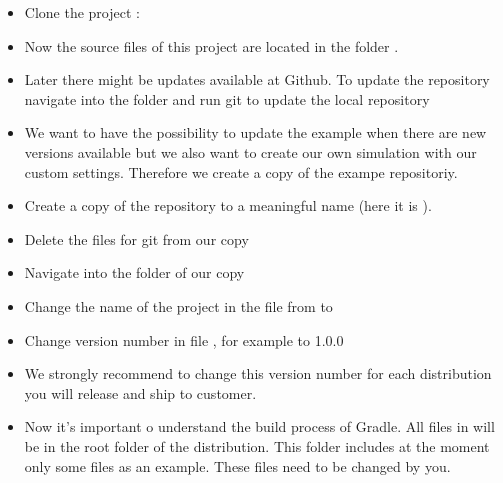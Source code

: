 \documentclass[a4paper]{doipdoc}
\begin{document}
		\begin{itemize}
			\item Clone the project :


			\item Now the source files of this project are located in the
			folder . 

			\item Later there might be updates available at Github. To 
			update the repository navigate into the folder 
			 and run git to update the local
			repository


			\item We want to have the possibility to update the example 
			when there are new versions available but we also want
			to create our own simulation with our custom settings. Therefore
			we create a copy of the exampe repositoriy.
			
			\item Create a copy of the repository to a meaningful name (here
				it is ).


			\item Delete the files for git from our copy


			\item Navigate into the folder of our copy


			\item Change the name of the project in the file 
			 from
			 to 

			\item Change version number in file 
			, for example to 1.0.0

			\item We strongly recommend to change this version number for
				each distribution you will release and ship to customer.

			\item Now it's important o understand the build process of Gradle.
			All files in  will be in the root folder of
			the distribution. This folder includes at the moment only some
			files as an example. These files need to be changed by you. 


\end{itemize}
\end{document}
